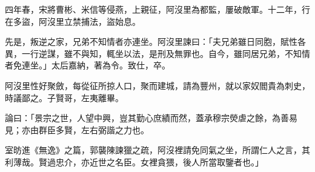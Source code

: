 \begin{pinyinscope}
 四年春，宋將曹彬、米信等侵燕，上親征，阿沒里為都監，屢破敵軍。十二年，行在多盜，阿沒里立禁捕法，盜始息。



 先是，叛逆之家，兄弟不知情者亦連坐。阿沒里諫曰：「夫兄弟雖日同胞，賦性各異，一行逆謀，雖不與知，輒坐以法，是刑及無罪也。自今，雖同居兄弟，不知情者免連坐。」太后嘉納，著為令。致仕，卒。



 阿沒里性好聚斂，每從征所掠人口，聚而建城，請為豐州，就以家奴閻貴為刺史，時議鄙之。子賢哥，左夷離畢。



 論曰：「景宗之世，人望中興，豈其勤心庶績而然，蓋承穆宗熒虐之餘，為善易見；亦由群臣多賢，左右弼諧之力也。



 室昉進《無逸》之篇，郭襲陳諫獵之疏，阿沒裡請免同氣之坐，所謂仁人之言，其利薄哉。賢過忠介，亦近世之名臣。女裡貪猥，後人所當取鑒者也。」



\end{pinyinscope}